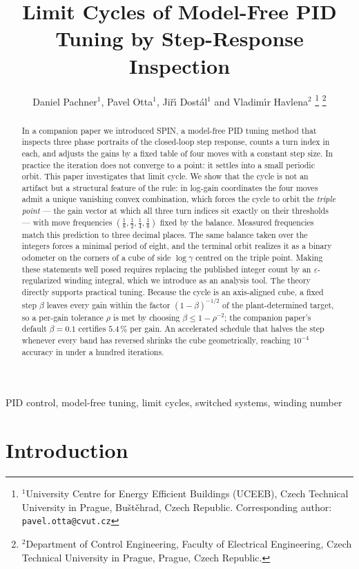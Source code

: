 \documentclass[letterpaper, 10pt, conference, twocolumn]{ieeeconf}
\title{Limit Cycles of Model-Free PID Tuning by Step-Response Inspection}
\author{Daniel Pachner$^{1}$, Pavel Otta$^{1}$, Ji\v{r}\'{\i} Dost\'al$^{1}$
and Vladim\'{\i}r Havlena$^{2}$%
\thanks{$^{1}$University Centre for Energy Efficient Buildings (UCEEB),
Czech Technical University in Prague, Bu\v{s}t\v{e}hrad, Czech Republic.
Corresponding author: \texttt{pavel.otta@cvut.cz}}%
\thanks{$^{2}$Department of Control Engineering, Faculty of Electrical
Engineering, Czech Technical University in Prague, Prague, Czech Republic.}%
}
\begin{document}
\maketitle

\begin{abstract}
In a companion paper we introduced SPIN, a model-free PID tuning method
that inspects three phase portraits of the closed-loop step response,
counts a turn index in each, and adjusts the gains by a fixed table of
four moves with a constant step size. In practice the iteration does not
converge to a point: it settles into a small periodic orbit. This paper
investigates that limit cycle. We show that the cycle is not an artifact
but a structural feature of the rule: in log-gain coordinates the four
moves admit a unique vanishing convex combination, which forces the
cycle to orbit the \emph{triple point} --- the gain vector at which all
three turn indices sit exactly on their thresholds --- with move
frequencies $(\tfrac18, \tfrac12, \tfrac14, \tfrac18)$ fixed by the
balance. Measured frequencies match this prediction to three decimal
places. The same balance taken over the integers forces a minimal period
of eight, and the terminal orbit realizes it as a binary odometer on the
corners of a cube of side $\log\gamma$ centred on the triple point.
Making these statements well posed requires replacing the published
integer count by an $\varepsilon$-regularized winding integral, which we
introduce as an analysis tool. The theory directly supports practical
tuning. Because the cycle is an axis-aligned cube, a fixed step $\beta$
leaves every gain within the factor $(1-\beta)^{-1/2}$ of the
plant-determined target, so a per-gain tolerance $\rho$ is met by
choosing $\beta \le 1-\rho^{-2}$; the companion paper's default
$\beta = 0.1$ certifies $5.4\,\%$ per gain. An accelerated schedule that
halves the step whenever every band has reversed shrinks the cube
geometrically, reaching $10^{-4}$ accuracy in under a hundred
iterations.
\end{abstract}

\begin{IEEEkeywords}
PID control, model-free tuning, limit cycles, switched systems,
winding number
\end{IEEEkeywords}

\section{Introduction}
\label{sec:intro}
\end{document}
